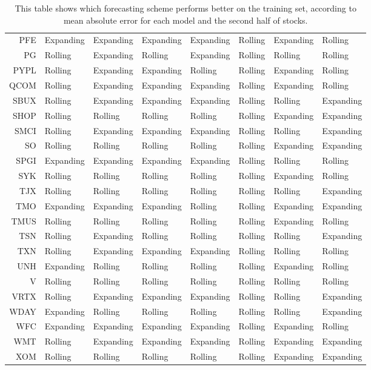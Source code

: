 \begin{table}[ht]
\begin{tabular}{rlllllll}
  PFE & Expanding & Expanding & Expanding & Expanding & Rolling & Expanding & Rolling \\ 
  PG & Rolling & Expanding & Rolling & Expanding & Rolling & Rolling & Rolling \\ 
  PYPL & Rolling & Expanding & Expanding & Rolling & Rolling & Expanding & Rolling \\ 
  QCOM & Rolling & Expanding & Expanding & Expanding & Rolling & Expanding & Rolling \\ 
  SBUX & Rolling & Expanding & Expanding & Expanding & Rolling & Rolling & Expanding \\ 
  SHOP & Rolling & Rolling & Rolling & Rolling & Rolling & Expanding & Expanding \\ 
  SMCI & Rolling & Expanding & Expanding & Expanding & Rolling & Rolling & Expanding \\ 
  SO & Rolling & Rolling & Rolling & Rolling & Rolling & Expanding & Expanding \\ 
  SPGI & Expanding & Expanding & Expanding & Expanding & Rolling & Rolling & Rolling \\ 
  SYK & Rolling & Rolling & Rolling & Rolling & Rolling & Expanding & Rolling \\ 
  TJX & Rolling & Rolling & Rolling & Rolling & Rolling & Rolling & Expanding \\ 
  TMO & Expanding & Expanding & Expanding & Rolling & Rolling & Expanding & Expanding \\ 
  TMUS & Rolling & Rolling & Rolling & Rolling & Rolling & Expanding & Rolling \\ 
  TSN & Rolling & Expanding & Rolling & Rolling & Rolling & Rolling & Expanding \\ 
  TXN & Rolling & Expanding & Expanding & Expanding & Rolling & Rolling & Rolling \\ 
  UNH & Expanding & Rolling & Rolling & Rolling & Rolling & Expanding & Rolling \\ 
  V & Rolling & Rolling & Rolling & Rolling & Rolling & Rolling & Rolling \\ 
  VRTX & Rolling & Expanding & Expanding & Expanding & Rolling & Rolling & Expanding \\ 
  WDAY & Expanding & Rolling & Rolling & Rolling & Rolling & Rolling & Expanding \\ 
  WFC & Expanding & Expanding & Expanding & Expanding & Rolling & Expanding & Rolling \\ 
  WMT & Rolling & Expanding & Expanding & Expanding & Rolling & Expanding & Expanding \\ 
  XOM & Rolling & Rolling & Rolling & Rolling & Rolling & Expanding & Expanding \\ 
   \hline
\end{tabular}
\caption[Better scheme MAE (2)]{This table shows which forecasting scheme performs better on the training set, according to mean absolute error
              for each model and the second half of stocks.} 
\label{Table:Better_MAE_2}
\end{table}
